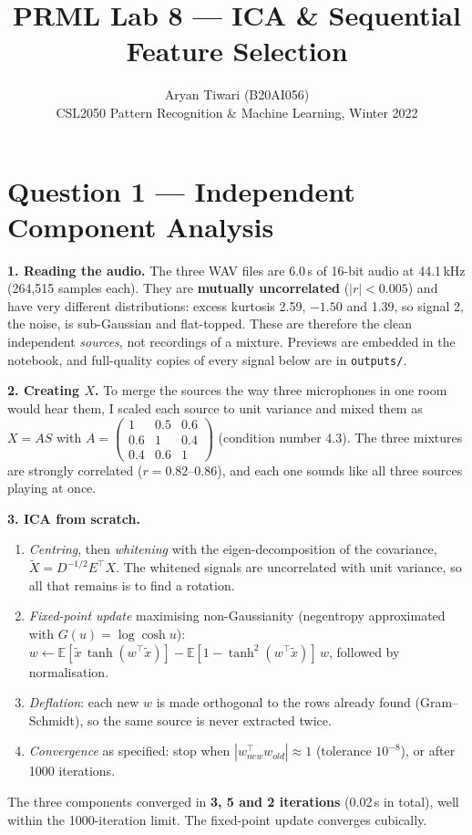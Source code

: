 \documentclass[11pt]{article}
\title{\textbf{PRML Lab 8 --- ICA \& Sequential Feature Selection}}
\author{Aryan Tiwari (B20AI056)\\CSL2050 Pattern Recognition \& Machine Learning, Winter 2022}
\date{}
\begin{document}
\maketitle

\section*{Question 1 --- Independent Component Analysis}

\textbf{1. Reading the audio.} The three WAV files are 6.0\,s of 16-bit audio at 44.1\,kHz (264{,}515 samples each). They are
\textbf{mutually uncorrelated} ($|r|<0.005$) and have very different distributions: excess kurtosis 2.59, $-1.50$ and 1.39, so signal 2,
the noise, is sub-Gaussian and flat-topped. These are therefore the clean independent \emph{sources}, not recordings of a mixture. Previews are
embedded in the notebook, and full-quality copies of every signal below are in \texttt{outputs/}.

\textbf{2. Creating $X$.} To merge the sources the way three microphones in one room would hear them, I scaled each source to unit
variance and mixed them as $X = AS$ with
$A=\left(\begin{smallmatrix}1&0.5&0.6\\0.6&1&0.4\\0.4&0.6&1\end{smallmatrix}\right)$ (condition number 4.3). The three mixtures are strongly
correlated ($r = 0.82$--$0.86$), and each one sounds like all three sources playing at once.

\textbf{3. ICA from scratch.}
\begin{enumerate}\itemsep0pt
\item \emph{Centring}, then \emph{whitening} with the eigen-decomposition of the covariance, $\tilde X = D^{-1/2}E^\top X$. The whitened signals are
uncorrelated with unit variance, so all that remains is to find a rotation.
\item \emph{Fixed-point update} maximising non-Gaussianity (negentropy approximated with $G(u)=\log\cosh u$):
$w \leftarrow \mathbb E[\tilde x\,\tanh(w^\top\tilde x)] - \mathbb E[1-\tanh^2(w^\top\tilde x)]\,w$, followed by normalisation.
\item \emph{Deflation}: each new $w$ is made orthogonal to the rows already found (Gram--Schmidt), so the same source is never extracted twice.
\item \emph{Convergence} as specified: stop when $|w_{new}^\top w_{old}|\approx1$ (tolerance $10^{-8}$), or after 1000 iterations.
\end{enumerate}
The three components converged in \textbf{3, 5 and 2 iterations} (0.02\,s in total), well within the 1000-iteration limit. The fixed-point update converges cubically.
\end{document}

